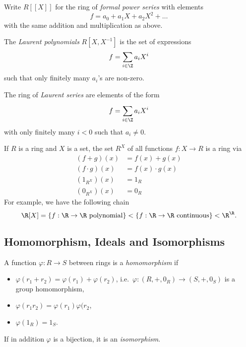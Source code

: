 \documentclass[a4paper]{article}
\theoremstyle{definition}
\begin{document}
\begin{eg}
  Write \(R[[X]]\) for the ring of \emph{formal power series} with elements
  \[
    f = a_0 + a_1X + a_2X^2 + \dots
  \]
  with the same addition and multiplication as above.
\end{eg}

\begin{eg}
  The \emph{Laurent polynomials} \(R[X, X^{-1}]\) is the set of expressions
  \[
    f = \sum_{i \in \Z} a_iX^i
  \]
  such that only finitely many \(a_i\)'s are non-zero.
\end{eg}

\begin{eg}
  The ring of \emph{Laurent series} are elements of the form
  \[
    f = \sum_{i \in \Z}^{ } a_iX^i
  \]
  with only finitely many \(i < 0\) such that \(a_i \neq 0\).
\end{eg}

\begin{eg}
  If \(R\) is a ring and \(X\) is a set, the set \(R^X\) of all functions \(f: X \to R\) is a ring via
  \begin{align*}
    (f + g)(x) &= f(x) + g(x) \\
    (f \cdot g)(x) &= f(x) \cdot g(x) \\
    (1_{R^X})(x) &= 1_R \\
    (0_{R^X})(x) &= 0_R
  \end{align*}
  For example, we have the following chain
  \[
    \R[X] = \{f: \R \to \R \text{ polynomial}\} < \{f: \R \to \R \text{ continuous}\} < \R^\R.
  \]
\end{eg}

\subsection{Homomorphism, Ideals and Isomorphisms}

\begin{definition}[Homomorphism]
  A function \(\varphi: R\to S\) between rings is a \emph{homomorphism} if
  \begin{itemize}
  \item \(\varphi(r_1 + r_2) = \varphi(r_1) + \varphi(r_2)\), i.e.\ \(\varphi:(R, +, 0_R) \to (S, +, 0_S)\) is a group homomorphism,
  \item \(\varphi(r_1r_2) = \varphi(r_1)\varphi(r_2\),
  \item \(\varphi(1_R) = 1_S\).
  \end{itemize}

  If in addition \(\varphi\) is a bijection, it is an \emph{isomorphism}.
\end{definition}
\end{document}
